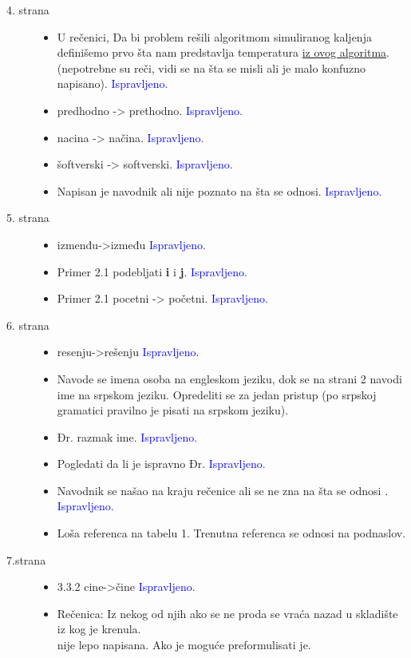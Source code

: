 \documentclass[a4paper]{report}
\newcommand{\odgovor}[1]{\textcolor{blue}{#1}}
\begin{document}
\begin{description}
\item [4. strana] 

\begin{itemize}
\item  U rečenici, Da bi problem rešili algoritmom simuliranog kaljenja definišemo prvo šta nam predstavlja temperatura \underline{iz ovog algoritma}. (nepotrebne su reči, vidi se na šta se misli ali je malo konfuzno napisano).
\odgovor {Ispravljeno.}
\item  predhodno -> prethodno.
\odgovor {Ispravljeno.}
\item nacina -> načina.
\odgovor {Ispravljeno.}
\item šoftverski -> softverski. 
\odgovor {Ispravljeno.}
\item  Napisan je navodnik ali nije poznato na šta se odnosi.
\odgovor {Ispravljeno.}
\end{itemize}

\item [5. strana] 

\begin{itemize}
\item izmenđu->između
\odgovor {Ispravljeno.}
\item Primer 2.1 podebljati \textbf{i} i \textbf{j}.
\odgovor {Ispravljeno.}
\item Primer 2.1 pocetni -> početni.
\odgovor {Ispravljeno.}
\end{itemize}  

\item [6. strana] 
\begin{itemize}
\item resenju->rešenju
\odgovor {Ispravljeno.}
\item Navode se imena osoba na engleskom jeziku, dok se na strani 2  navodi ime na srpskom jeziku. Opredeliti se za jedan pristup (po srpskoj  gramatici pravilno je pisati na srpskom jeziku).
\item  Đr. razmak ime. 
\odgovor {Ispravljeno.}
\item Pogledati da li je ispravno Đr. 
\odgovor {Ispravljeno.}
\item Navodnik se našao na kraju rečenice ali se ne zna na šta se odnosi .
\odgovor {Ispravljeno.}
\item  Loša referenca na tabelu 1. Trenutna referenca se odnosi na podnaslov.
\end{itemize}

\item [7.strana] 
\begin{itemize}
\item 3.3.2 cine->čine
\odgovor {Ispravljeno.}
\item Rečenica: Iz nekog od njih ako se ne proda se vraća nazad u skladište iz kog je krenula.\\
nije lepo napisana. Ako je moguće preformulisati je.
\end{itemize}


\end{description}
\end{document}
